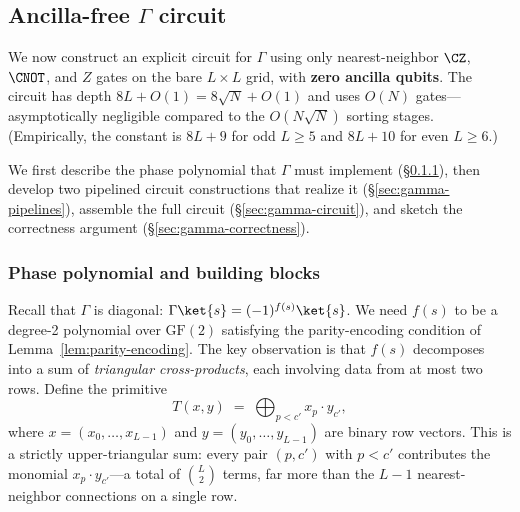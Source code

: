 
\subsection{Ancilla-free $\Gamma$ circuit}
\label{sec:gamma-impl}

We now construct an explicit circuit for $\Gamma$ using only nearest-neighbor $\CZ$, $\CNOT$, and $Z$ gates on the bare $L \times L$ grid, with \textbf{zero ancilla qubits}.
The circuit has depth $8L + O(1) = 8\sqrt{N} + O(1)$ and uses $O(N)$ gates---asymptotically negligible compared to the $O(N\sqrt{N})$ sorting stages.
(Empirically, the constant is $8L + 9$ for odd $L \ge 5$ and $8L + 10$ for even $L \ge 6$.)

We first describe the phase polynomial that $\Gamma$ must implement (\S\ref{sec:gamma-structure}), then develop two pipelined circuit constructions that realize it (\S\ref{sec:gamma-pipelines}), assemble the full circuit (\S\ref{sec:gamma-circuit}), and sketch the correctness argument (\S\ref{sec:gamma-correctness}).


\subsubsection{Phase polynomial and building blocks}
\label{sec:gamma-structure}

Recall that $\Gamma$ is diagonal: $\Gamma\ket{s} = (-1)^{f(s)}\ket{s}$.
We need $f(s)$ to be a degree-2 polynomial over $\mathrm{GF}(2)$ satisfying the parity-encoding condition of Lemma~\ref{lem:parity-encoding}.
The key observation is that $f(s)$ decomposes into a sum of \emph{triangular cross-products}, each involving data from at most two rows.
Define the primitive
\begin{equation}
T(x, y) \;=\; \bigoplus_{p < c'} x_p \cdot y_{c'},
\label{eq:primitive-T}
\end{equation}
where $x = (x_0, \ldots, x_{L-1})$ and $y = (y_0, \ldots, y_{L-1})$ are binary row vectors.
This is a strictly upper-triangular sum: every pair $(p, c')$ with $p < c'$ contributes the monomial $x_p \cdot y_{c'}$---a total of $\binom{L}{2}$ terms, far more than the $L{-}1$ nearest-neighbor connections on a single row.

